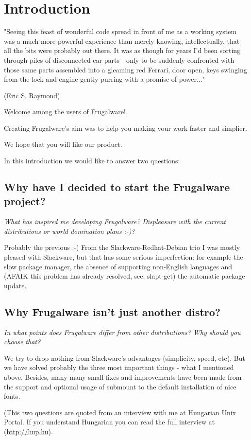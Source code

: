 \chapter{Introduction}

\begin{flushright}
"Seeing this feast of wonderful code spread in front of me as a working system was a much more powerful experience than merely knowing, intellectually, that all the bits were probably out there. It was as though for years I'd been sorting through piles of disconnected car parts - only to be suddenly confronted with those same parts assembled into a gleaming red Ferrari, door open, keys swinging from the lock and engine gently purring with a promise of power..."

(Eric S. Raymond)
\end{flushright}

Welcome among the users of Frugalware!

Creating Frugalware's aim was to help you making your work faster and simplier.

We hope that you will like our product.

In this introduction we would like to answer two questions:

\section{Why have I decided to start the Frugalware project?}

\textit{What has inspired me developing Frugalware? Displeasure with the current distributions or world domination plans :-)?}

Probably the previous :-) From the Slackware-Redhat-Debian trio I was mostly pleased with Slackware, but that has some serious imperfection: for example the slow package manager, the absence of supporting non-English languages and (AFAIK this problem has already resolved, see. slapt-get) the automatic package update.

\section{Why Frugalware isn't just another distro?}

\textit{In what points does Frugalware differ from other distributions? Why should you choose that?}

We try to drop nothing from Slackware's advantages (simplicity, speed, etc). But we have solved probably the three most important things - what I mentioned above. Besides, many-many small fixes and improvements have been made from the support and optional usage of submount to the default installation of nice fonts.

(This two questions are quoted from an interview with me at Hungarian Unix Portal. If you understand Hungarian you can read the full interview at (\url{http://hup.hu}).

